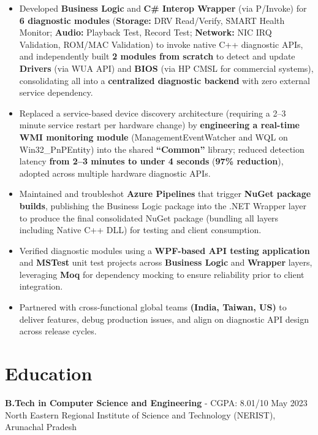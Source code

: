 \documentclass[a4paper,10pt]{article}
\begin{document}
\begin{itemize}[leftmargin=*, itemsep=5pt, parsep=0pt, topsep=2pt]
\item Developed \textbf{Business Logic} and \textbf{C\# Interop Wrapper} (via P/Invoke) for \textbf{6 diagnostic modules} (\textbf{Storage:} DRV Read/Verify, SMART Health Monitor; \textbf{Audio:} Playback Test, Record Test; \textbf{Network:} NIC IRQ Validation, ROM/MAC Validation) to invoke native C++ diagnostic APIs, and independently built \textbf{2 modules from scratch} to detect and update \textbf{Drivers} (via WUA API) and \textbf{BIOS} (via HP CMSL for commercial systems), consolidating all into a \textbf{centralized diagnostic backend} with zero external service dependency.

\item Replaced a service-based device discovery architecture (requiring a 2--3 minute service restart per hardware change) by \textbf{engineering a real-time WMI monitoring module} (ManagementEventWatcher and WQL on Win32\_PnPEntity) into the shared \textbf{``Common''} library; reduced detection latency \textbf{from 2--3 minutes to under 4 seconds} (\textbf{97\% reduction}), adopted across multiple hardware diagnostic APIs.

\item Maintained and troubleshot \textbf{Azure Pipelines} that trigger \textbf{NuGet package builds}, publishing the Business Logic package into the .NET Wrapper layer to produce the final consolidated NuGet package (bundling all layers including Native C++ DLL) for testing and client consumption.

\item Verified diagnostic modules using a \textbf{WPF-based API testing application} and \textbf{MSTest} unit test projects across \textbf{Business Logic} and \textbf{Wrapper} layers, leveraging \textbf{Moq} for dependency mocking to ensure reliability prior to client integration.

\item Partnered with cross-functional global teams \textbf{(India, Taiwan, US)} to deliver features, debug production issues, and align on diagnostic API design across release cycles.

\end{itemize}

\section*{Education}

\textbf{B.Tech in Computer Science and Engineering} - CGPA: 8.01/10 \hfill May 2023 \\
North Eastern Regional Institute of Science and Technology (NERIST), Arunachal Pradesh
\end{document}
